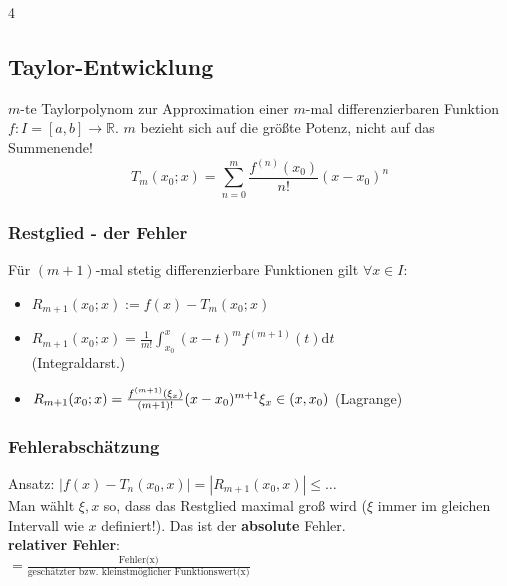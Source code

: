 \documentclass[6pt,a4paper]{scrartcl}
\begin{document}
\begin{multicols*}{4}
\begin{sectionbox}
		\everymath{\textstyle}
	\end{sectionbox}

	\subsection{Taylor-Entwicklung}
	$m$-te Taylorpolynom zur Approximation einer $m$-mal differenzierbaren Funktion $f:I=[a,b] \rightarrow \mathbb R$. $m$ bezieht sich auf die größte Potenz, nicht auf das Summenende!
	\begin{equation*}
		T_m(x_0;x)=\sum_{n=0}^{m}\frac{f^{(n)}(x_0)}{n!}(x-x_0)^n
	\end{equation*}

	\begin{sectionbox}
		\subsubsection{Restglied - der Fehler}
		Für $(m+1)$-mal stetig differenzierbare Funktionen gilt $\forall x \in I$:
		\everymath{\displaystyle}
		\begin{itemize}
			\item $R_{m+1}(x_0;x):=f(x)-T_m(x_0;x)$
			\item $R_{m+1}(x_0;x)=\frac{1}{m!}\int_{x_0}^{x}(x-t)^mf^{(m+1)}(t)\mathrm dt$\\ (Integraldarst.)
			\item $R_{m+1}(x_0;x)=\frac{f^{(m+1)}(\xi_x)}{(m+1)!}(x-x_0)^{m+1} \\ \xi_x\in (x,x_0)$ (Lagrange)
		\end{itemize}
		\everymath{\textstyle}

		\subsubsection{Fehlerabschätzung}
		Ansatz: $|f(x)-T_n(x_0,x)|=|R_{m+1}(x_0,x)| \le \dots$\\
		Man wählt $\xi, x$ so, dass das Restglied maximal groß wird ($\xi$ immer im gleichen Intervall wie $x$ definiert!). Das ist der \textbf{absolute} Fehler.\\
		\textbf{relativer Fehler}: \\
		$= \frac{\text{Fehler(x)}}{\text{geschätzter bzw. kleinstmöglicher Funktionswert(x)}}$
	\end{sectionbox}

	\begin{sectionbox}

\end{sectionbox}
\end{multicols*}
\end{document}

